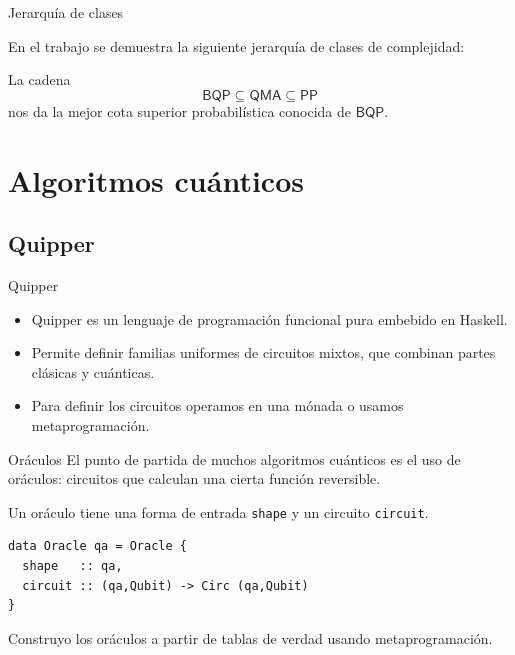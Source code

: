 \documentclass[ignorenonframetext,aspectratio=43,]{beamer}
\begin{document}
\begin{frame}{Jerarquía de clases}

  En el trabajo se demuestra la siguiente jerarquía de clases de complejidad:

  \begin{figure}[h]
    \centering
    
  \end{figure}

  \pause

  La cadena
  $$\mathsf{BQP} \subseteq \mathsf{QMA} \subseteq \mathsf{PP}$$
  nos da la mejor cota superior probabilística conocida de $\mathsf{BQP}$.

\end{frame}




\section{Algoritmos cuánticos}

\subsection{Quipper}

\begin{frame}{Quipper}

  \begin{itemize}
\item Quipper es un lenguaje de programación funcional pura embebido en Haskell.

\item Permite definir familias uniformes de circuitos mixtos, que combinan partes clásicas y cuánticas.

\item Para definir los circuitos operamos en una mónada o usamos metaprogramación.
\end{itemize}

\end{frame}

\begin{frame}[fragile]{Oráculos}
  El punto de partida de muchos algoritmos cuánticos es el uso de oráculos:
  circuitos que calculan una cierta función reversible.

  \pause

  Un oráculo tiene una forma de entrada \texttt{shape} y un circuito \texttt{circuit}.

  \begin{lstlisting}
data Oracle qa = Oracle {
  shape   :: qa,
  circuit :: (qa,Qubit) -> Circ (qa,Qubit)
}
\end{lstlisting}

Construyo los oráculos a partir de tablas de verdad usando metaprogramación.

\end{frame}
\end{document}
